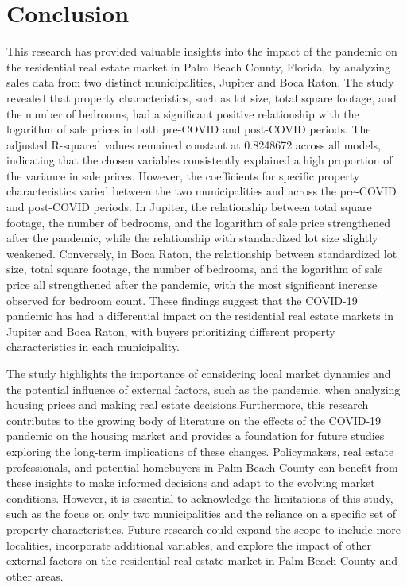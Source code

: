 \documentclass[12pt,english]{article}
\begin{document}
\section{Conclusion}\label{sec:conclusion}
This research has provided valuable insights into the impact of the pandemic on the residential real estate market in Palm Beach County, Florida, by analyzing sales data from two distinct municipalities, Jupiter and Boca Raton. The study revealed that property characteristics, such as lot size, total square footage, and the number of bedrooms, had a significant positive relationship with the logarithm of sale prices in both pre-COVID and post-COVID periods. The adjusted R-squared values remained constant at 0.8248672 across all models, indicating that the chosen variables consistently explained a high proportion of the variance in sale prices. However, the coefficients for specific property characteristics varied between the two municipalities and across the pre-COVID and post-COVID periods. In Jupiter, the relationship between total square footage, the number of bedrooms, and the logarithm of sale price strengthened after the pandemic, while the relationship with standardized lot size slightly weakened. Conversely, in Boca Raton, the relationship between standardized lot size, total square footage, the number of bedrooms, and the logarithm of sale price all strengthened after the pandemic, with the most significant increase observed for bedroom count. 
These findings suggest that the COVID-19 pandemic has had a differential impact on the residential real estate markets in Jupiter and Boca Raton, with buyers prioritizing different property characteristics in each municipality. 

The study highlights the importance of considering local market dynamics and the potential influence of external factors, such as the pandemic, when analyzing housing prices and making real estate decisions.Furthermore, this research contributes to the growing body of literature on the effects of the COVID-19 pandemic on the housing market and provides a foundation for future studies exploring the long-term implications of these changes. Policymakers, real estate professionals, and potential homebuyers in Palm Beach County can benefit from these insights to make informed decisions and adapt to the evolving market conditions. However, it is essential to acknowledge the limitations of this study, such as the focus on only two municipalities and the reliance on a specific set of property characteristics. Future research could expand the scope to include more localities, incorporate additional variables, and explore the impact of other external factors on the residential real estate market in Palm Beach County and other areas. 
 
\end{document}
